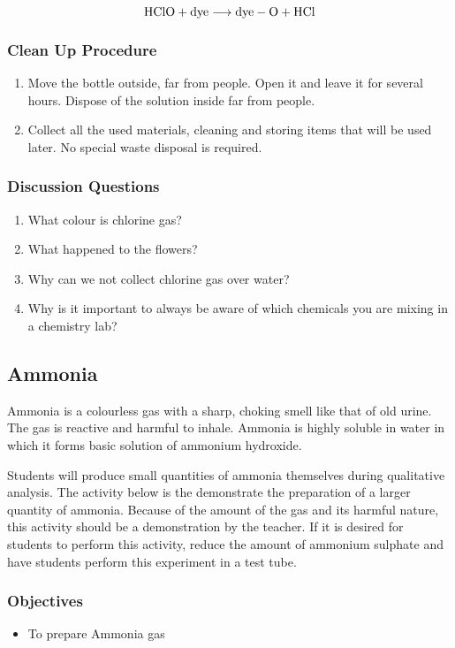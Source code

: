 $$\ce{HClO} + \mathrm{dye} \longrightarrow \mathrm{dye-O} + \ce{HCl}$$


\subsubsection*{Clean Up Procedure}
\begin{enumerate}
\item{Move the bottle outside, far from people. Open it and leave it for several hours. Dispose of the solution inside far from people.}
\item{Collect all the used materials, cleaning and storing items that will be used later. No special waste disposal is required.}
\end{enumerate}

\subsubsection*{Discussion Questions}
\begin{enumerate}
\item{What colour is chlorine gas?}
\item{What happened to the flowers?}
\item{Why can we not collect chlorine gas over water?}
\item{Why is it important to always be aware of which chemicals you are mixing in a chemistry lab?}
\end{enumerate}

\subsection{Ammonia}

Ammonia is a colourless gas with a sharp, choking smell like that of old urine. The gas is reactive and harmful to inhale. Ammonia is highly soluble in water in which it forms basic solution of ammonium hydroxide.

Students will produce small quantities of ammonia themselves during qualitative analysis. The activity below is the demonstrate the preparation of a larger quantity of ammonia. Because of the amount of the gas and its harmful nature, this activity should be a demonstration by the teacher. If it is desired for students to perform this activity, reduce the amount of ammonium sulphate and have students perform this experiment in a test tube.

\subsubsection*{Objectives}
\begin{itemize}
\item{To prepare Ammonia gas}
\end{itemize}

